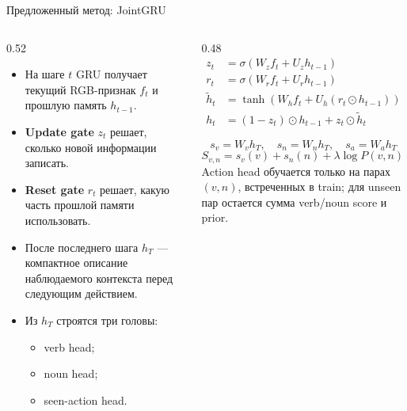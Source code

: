 \documentclass[aspectratio=169,10pt]{beamer}
\begin{document}
\begin{frame}{Предложенный метод: JointGRU}
    \small
    \begin{columns}
        \begin{column}{0.52\textwidth}
            \begin{itemize}
                \item На шаге \(t\) GRU получает текущий RGB-признак \(f_t\) и прошлую память \(h_{t-1}\).
                \item \textbf{Update gate} \(z_t\) решает, сколько новой информации записать.
                \item \textbf{Reset gate} \(r_t\) решает, какую часть прошлой памяти использовать.
                \item После последнего шага \(h_T\) --- компактное описание наблюдаемого контекста перед следующим действием.
                \item Из \(h_T\) строятся три головы:
                \begin{itemize}
                    \item verb head;
                    \item noun head;
                    \item seen-action head.
                \end{itemize}
            \end{itemize}
        \end{column}
        \begin{column}{0.48\textwidth}
            \scriptsize
            \[
            \begin{aligned}
                z_t &= \sigma(W_z f_t + U_z h_{t-1}) \\
                r_t &= \sigma(W_r f_t + U_r h_{t-1}) \\
                \tilde h_t &= \tanh(W_h f_t + U_h(r_t \odot h_{t-1})) \\
                h_t &= (1-z_t)\odot h_{t-1} + z_t\odot \tilde h_t
            \end{aligned}
            \]

            \vspace{0.05cm}
            \[
                s_v = W_v h_T,\quad
                s_n = W_n h_T,\quad
                s_a = W_a h_T
            \]
            \[
                S_{v,n} =
                s_v(v) + s_n(n)
                + \lambda \log P(v,n)
                + \gamma s_a(v,n)
            \]
            \footnotesize
            Action head обучается только на парах \((v,n)\), встреченных в train;
            для unseen пар остается сумма verb/noun score и prior.
        \end{column}
    \end{columns}
\end{frame}
\end{document}
